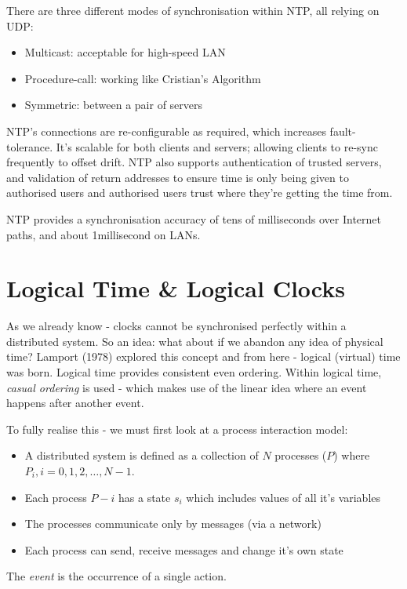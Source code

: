 There are three different modes of synchronisation within NTP, all relying on UDP:
\begin{itemize}
    \item Multicast: acceptable for high-speed LAN
    \item Procedure-call: working like Cristian's Algorithm
    \item Symmetric: between a pair of servers
\end{itemize}

NTP's connections are re-configurable as required, which increases fault-tolerance. It's scalable for both clients and servers; allowing clients to re-sync frequently to offset drift. NTP also supports authentication of trusted servers, and validation of return addresses to ensure time is only being given to authorised users and authorised users trust where they're getting the time from. 

NTP provides a synchronisation accuracy of tens of milliseconds over Internet paths, and about 1millisecond on LANs. 

\section{Logical Time \& Logical Clocks}
As we already know - clocks cannot be synchronised perfectly within a distributed system. So an idea: what about if we abandon any idea of physical time? Lamport (1978) explored this concept and from here - logical (virtual) time was born. Logical time provides consistent even ordering. Within logical time, \textit{casual ordering} is used - which makes use of the linear idea where an event happens after another event.

To fully realise this - we must first look at a process interaction model:
\begin{itemize}
    \item A distributed system is defined as a collection of $N$ processes ($P$) where $P_i, i = 0, 1,2, \ldots, N-1$. 
    \item Each process $P-i$ has a state $s_i$ which includes values of all it's variables
    \item The processes communicate only by messages (via a network)
    \item Each process can send, receive messages and change it's own state
\end{itemize}

The \textit{event} is the occurrence of a single action. 

